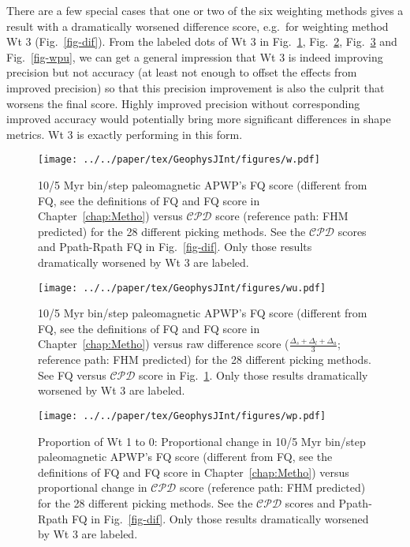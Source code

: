 There are a few special cases that one or two of the six weighting methods gives
a result with a dramatically worsened difference score, e.g.\ for weighting
method Wt 3 (Fig.~\ref{fig-dif}). From the labeled dots of Wt 3 in
Fig.~\ref{fig-w}, Fig.~\ref{fig-wu}, Fig.~\ref{fig-wp} and Fig.~\ref{fig-wpu},
we can get a general impression that Wt 3 is indeed improving precision
but not accuracy (at least not enough to offset the effects from improved
precision) so that this precision improvement is also the culprit that worsens
the final score. Highly improved precision without corresponding improved
accuracy would potentially bring more significant differences in shape metrics.
Wt 3 is exactly performing in this form.

\begin{figure}
  \centering
  \texttt{[image: ../../paper/tex/GeophysJInt/figures/w.pdf]}
  \caption[Paleomagnetic APWP's FQ score vs significant difference score (i.e.
    $\mathcal{CPD}$)]{10/5 Myr bin/step paleomagnetic APWP's FQ score (different
    from FQ, see the definitions of FQ and FQ score in Chapter~\ref{chap:Metho})
    versus $\mathcal{CPD}$ score (reference path: FHM predicted) for the 28
    different picking methods. See the $\mathcal{CPD}$ scores and Ppath-Rpath FQ
    in Fig.~\ref{fig-dif}. Only those results dramatically worsened by Wt 3 are
    labeled.}\label{fig-w}
\end{figure}

\begin{figure}
  \centering
  \texttt{[image: ../../paper/tex/GeophysJInt/figures/wu.pdf]}
  \caption[Paleomagnetic APWP's FQ score vs raw difference score (i.e., no
    statistical testing)]{10/5 Myr bin/step paleomagnetic APWP's FQ score
    (different from FQ, see the definitions of FQ and FQ score in
    Chapter~\ref{chap:Metho}) versus raw difference score
    ($\frac{\Delta_s+\Delta_l+\Delta_a}{3}$; reference path: FHM predicted) for
    the 28 different picking methods. See FQ versus $\mathcal{CPD}$ score in
    Fig.~\ref{fig-w}. Only those results dramatically worsened by Wt 3 are
    labeled.}\label{fig-wu}
\end{figure}

\begin{figure}
  \centering
  \texttt{[image: ../../paper/tex/GeophysJInt/figures/wp.pdf]}
  \caption[Proportional changes of Wt 1 to 0: Paleomagnetic APWP's
    FQ score vs $\mathcal{CPD}$]{Proportion of Wt 1 to 0:
    Proportional change in 10/5 Myr bin/step paleomagnetic APWP's FQ score
    (different from FQ, see the definitions of FQ and FQ score in
    Chapter~\ref{chap:Metho}) versus proportional change in $\mathcal{CPD}$
    score (reference path: FHM predicted) for the 28 different picking methods.
    See the $\mathcal{CPD}$ scores and Ppath-Rpath FQ in Fig.~\ref{fig-dif}.
    Only those results dramatically worsened by Wt 3 are labeled.}\label{fig-wp}
\end{figure}

